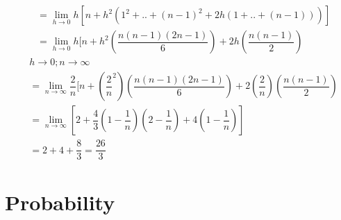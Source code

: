\documentclass[journal,12pt,twocolumn]{IEEEtran}
\renewcommand\thesection{\arabic{section}}
\begin{document}
\begin{enumerate}[label=\thesection.\arabic*.,ref=\thesection.\theenumi]
\begin{align}
&=  \lim_{h \to0}h[n+h^2(1^2+..+(n-1)^2+2h(1+..+(n-1)))]\\
& = \lim_{h \to0}h[n+h^2\left( \dfrac{n(n-1)(2n-1)}{6}\right) +2h \left( \dfrac{n(n-1)}{2}\right)
\end{align}
\begin{align}
& h\to 0; n\to \infty\\
& = \lim_{n \to\infty}\dfrac{2}{n}[n+\left(\dfrac{2}{n}^2\right)\left( \dfrac{n(n-1)(2n-1)}{6}\right) +2\left(\dfrac{2}{n}\right) \left( \dfrac{n(n-1)}{2}\right)\\
& =  \lim_{n \to\infty}[2+\dfrac{4}{3}(1-\dfrac{1}{n})(2-\dfrac{1}{n}) +4(1-\dfrac{1}{n})]\\
& = 2+4+\dfrac{8}{3} = \dfrac{26}{3} 
 \end{align}
 \end{enumerate}
 \section{Probability}
\renewcommand{\theequation}{\theenumi}
\end{document}
